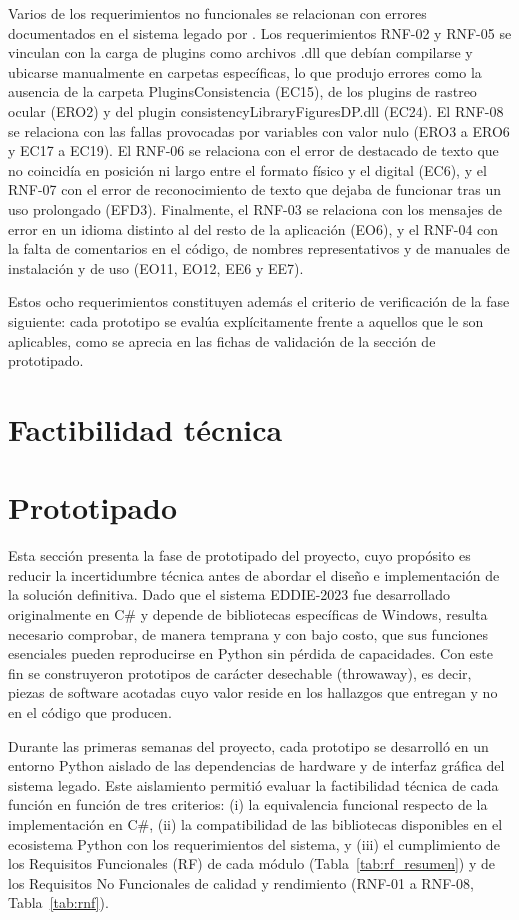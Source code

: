Varios de los requerimientos no funcionales se relacionan con errores documentados en el sistema legado por \cite{ibaceta2023evaluacion}. Los requerimientos RNF-02 y RNF-05 se vinculan con la carga de plugins como archivos .dll que debían compilarse y ubicarse manualmente en carpetas específicas, lo que produjo errores como la ausencia de la carpeta PluginsConsistencia (EC15), de los plugins de rastreo ocular (ERO2) y del plugin consistencyLibraryFiguresDP.dll (EC24). El RNF-08 se relaciona con las fallas provocadas por variables con valor nulo (ERO3 a ERO6 y EC17 a EC19). El RNF-06 se relaciona con el error de destacado de texto que no coincidía en posición ni largo entre el formato físico y el digital (EC6), y el RNF-07 con el error de reconocimiento de texto que dejaba de funcionar tras un uso prolongado (EFD3). Finalmente, el RNF-03 se relaciona con los mensajes de error en un idioma distinto al del resto de la aplicación (EO6), y el RNF-04 con la falta de comentarios en el código, de nombres representativos y de manuales de instalación y de uso (EO11, EO12, EE6 y EE7).
 
Estos ocho requerimientos constituyen además el criterio de verificación de la fase siguiente: cada prototipo se evalúa explícitamente frente a aquellos que le son aplicables, como se aprecia en las fichas de validación de la sección de prototipado.

\section{Factibilidad técnica}



\section{Prototipado}
Esta sección presenta la fase de prototipado del proyecto, cuyo propósito es reducir la incertidumbre técnica antes de abordar el diseño e implementación de la solución definitiva. Dado que el sistema EDDIE-2023 fue desarrollado originalmente en C\# y depende de bibliotecas específicas de Windows, resulta necesario comprobar, de manera temprana y con bajo costo, que sus funciones esenciales pueden reproducirse en Python sin pérdida de capacidades. Con este fin se construyeron prototipos de carácter desechable (throwaway), es decir, piezas de software acotadas cuyo valor reside en los hallazgos que entregan y no en el código que producen.
 
Durante las primeras semanas del proyecto, cada prototipo se desarrolló en un entorno Python aislado de las dependencias de hardware y de interfaz gráfica del sistema legado. Este aislamiento permitió evaluar la factibilidad técnica de cada función en función de tres criterios: (i) la equivalencia funcional respecto de la implementación en C\#, (ii) la compatibilidad de las bibliotecas disponibles en el ecosistema Python con los requerimientos del sistema, y (iii) el cumplimiento de los Requisitos Funcionales (RF) de cada módulo (Tabla~\ref{tab:rf_resumen}) y de los Requisitos No Funcionales de calidad y rendimiento (RNF-01 a RNF-08, Tabla~\ref{tab:rnf}).
 
